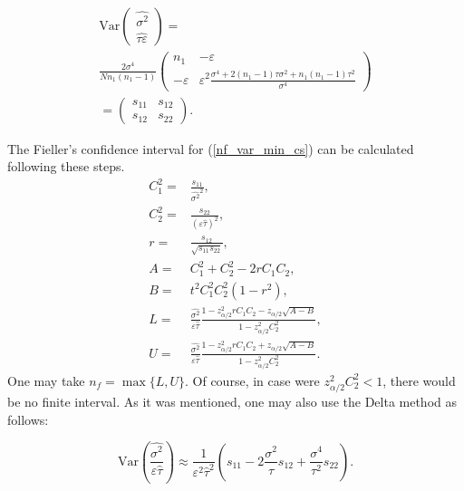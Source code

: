 \documentclass[11pt,a5paper,twoside]{book}
\begin{document}
{\begin{multline}
\mathrm{Var}  \left(
\begin{array}{c}
\widehat{\sigma^2}\\
\widehat{\tau\varepsilon}
\end{array} \right) =  \\ \frac{2 \sigma^4}{Nn_1(n_1-1)}  \left(
\begin{array}{cc}
n_1 & -\varepsilon \\
-\varepsilon & \varepsilon^2\frac{\sigma^4 + 2(n_1-1) \tau \sigma^2 + n_1 (n_1-1) \tau^2}{\sigma^4}
\end{array} \right) \\ = \left(
\begin{array}{cc}
s_{11} &  s_{12} \\ s_{12} & s_{22}
\end{array} \right).
\end{multline}

The Fieller's confidence interval for (\ref{nf_var_min_cs}) can be calculated following these steps.
\begin{equation}
\begin{aligned}
C_1^2 =&\frac{s_{11}}{\widehat{\sigma^2}^2}, \\
C_2^2=& \frac{s_{22}}{\left(\varepsilon\widehat{\tau}\right)^2},\\
r= & \frac{s_{12}}{\sqrt{s_{11} s_{22}}},\\
A= &C_1^2 + C_2^2 - 2r C_1C_2,\\
B=& t^2 C_1^2 C_2^2 (1-r^2),\\
L=& \frac{\widehat{\sigma^2}}{\varepsilon\widehat{\tau}} \frac{1-z_{\alpha/2}^2 r C_1C_2 - z_{\alpha/2}\sqrt{A-B}}{1-z_{\alpha/2}^2C_2^2},\\
U=& \frac{\widehat{\sigma^2}}{\varepsilon\widehat{\tau}} \frac{1-z_{\alpha/2}^2 r C_1C_2 + z_{\alpha/2}\sqrt{A-B}}{1-z_{\alpha/2}^2C_2^2}.
\end{aligned}
\end{equation}
One may take $n_f=\max\{L,U\}$. Of course, in case were $z_{\alpha/2}^2 C_2^2 <1$, there would be no finite interval. As it was mentioned, one may also use the Delta method as follows:

\begin{equation}
\label{var_delta_method}
\mathrm{Var}(\frac{\widehat{\sigma^2}}{\varepsilon \widehat{\tau}}) \approx \frac{1}{\varepsilon^2 \widehat{\tau}^2} \left( s_{11} - 2 \frac{\sigma^2}{\tau} s_{12} + \frac{\sigma^4}{\tau^2} s_{22} \right).
\end{equation}

}
\end{document}
